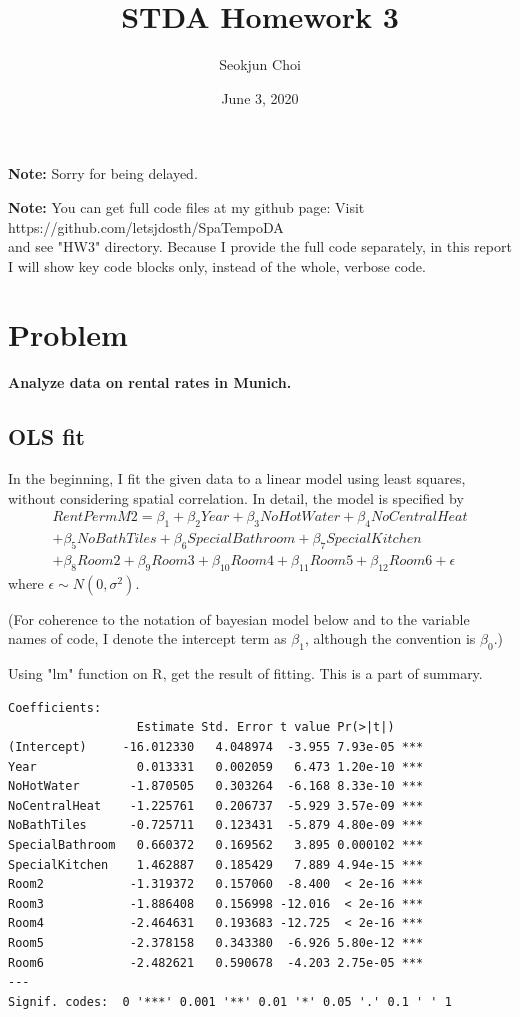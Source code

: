 \documentclass{article}
\begin{document}
\title{STDA Homework 3}
\author{Seokjun Choi}
\date{June 3, 2020}
\maketitle

\textbf{Note:}
Sorry for being delayed. 

\textbf{Note:}
You can get full code files at my github page: Visit https://github.com/letsjdosth/SpaTempoDA \\
and see "HW3" directory. Because I provide the full code separately, in this report 
I will show key code blocks only, instead of the whole, verbose code.

\section{Problem}
\textbf{
Analyze data on rental rates in Munich.
}
\subsection{OLS fit}

In the beginning, I fit the given data to a linear model using least squares, 
without considering spatial correlation. In detail, the model is specified by
\begin{align*}
RentPermM2 = \beta_1 + \beta_2 Year + \beta_3 NoHotWater + \beta_4 NoCentralHeat \\
+ \beta_5 NoBathTiles + \beta_6 SpecialBathroom + \beta_7 SpecialKitchen\\
+ \beta_8 Room2 + \beta_9 Room3 + \beta_10 Room4 + \beta_11 Room5 + \beta_12 Room6 + \epsilon
\end{align*}
where $\epsilon \sim N(0,\sigma^2)$.

(For coherence to the notation of bayesian model below and to the variable names of code,
I denote the intercept term as $\beta_1$, although the convention is $\beta_0$.)

Using "lm" function on R, get the result of fitting. This is a part of summary.

\begin{verbatim}
Coefficients:
                  Estimate Std. Error t value Pr(>|t|)
(Intercept)     -16.012330   4.048974  -3.955 7.93e-05 ***
Year              0.013331   0.002059   6.473 1.20e-10 ***
NoHotWater       -1.870505   0.303264  -6.168 8.33e-10 ***
NoCentralHeat    -1.225761   0.206737  -5.929 3.57e-09 ***
NoBathTiles      -0.725711   0.123431  -5.879 4.80e-09 ***
SpecialBathroom   0.660372   0.169562   3.895 0.000102 ***
SpecialKitchen    1.462887   0.185429   7.889 4.94e-15 ***
Room2            -1.319372   0.157060  -8.400  < 2e-16 ***
Room3            -1.886408   0.156998 -12.016  < 2e-16 ***
Room4            -2.464631   0.193683 -12.725  < 2e-16 ***
Room5            -2.378158   0.343380  -6.926 5.80e-12 ***
Room6            -2.482621   0.590678  -4.203 2.75e-05 ***
---
Signif. codes:  0 '***' 0.001 '**' 0.01 '*' 0.05 '.' 0.1 ' ' 1
\end{verbatim}
\end{document}
